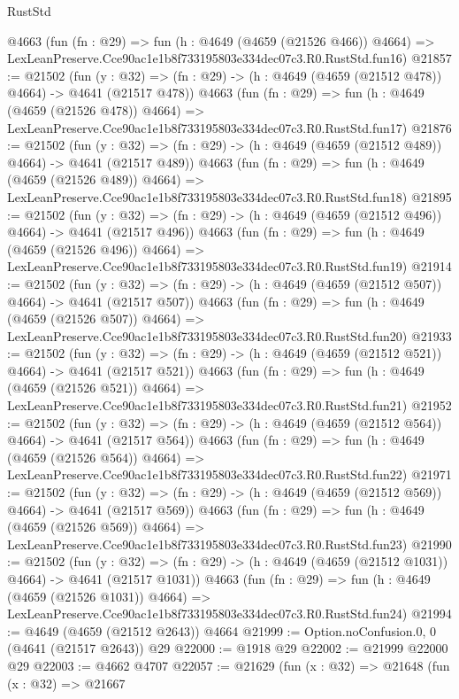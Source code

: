 \begin{lexlean}{RustStd}
\begin{coremodule}
    @4663
    (fun (fn : @29) =>
    fun (h : @4649 (@4659 (@21526 @466)) @4664) =>
    LexLeanPreserve.Cce90ac1e1b8f733195803e334dec07c3.R0.RustStd.fun16)
@21857 := @21502
    (fun (y : @32) => (fn : @29) -> (h : @4649 (@4659 (@21512 @478)) @4664) -> @4641 (@21517 @478))
    @4663
    (fun (fn : @29) =>
    fun (h : @4649 (@4659 (@21526 @478)) @4664) =>
    LexLeanPreserve.Cce90ac1e1b8f733195803e334dec07c3.R0.RustStd.fun17)
@21876 := @21502
    (fun (y : @32) => (fn : @29) -> (h : @4649 (@4659 (@21512 @489)) @4664) -> @4641 (@21517 @489))
    @4663
    (fun (fn : @29) =>
    fun (h : @4649 (@4659 (@21526 @489)) @4664) =>
    LexLeanPreserve.Cce90ac1e1b8f733195803e334dec07c3.R0.RustStd.fun18)
@21895 := @21502
    (fun (y : @32) => (fn : @29) -> (h : @4649 (@4659 (@21512 @496)) @4664) -> @4641 (@21517 @496))
    @4663
    (fun (fn : @29) =>
    fun (h : @4649 (@4659 (@21526 @496)) @4664) =>
    LexLeanPreserve.Cce90ac1e1b8f733195803e334dec07c3.R0.RustStd.fun19)
@21914 := @21502
    (fun (y : @32) => (fn : @29) -> (h : @4649 (@4659 (@21512 @507)) @4664) -> @4641 (@21517 @507))
    @4663
    (fun (fn : @29) =>
    fun (h : @4649 (@4659 (@21526 @507)) @4664) =>
    LexLeanPreserve.Cce90ac1e1b8f733195803e334dec07c3.R0.RustStd.fun20)
@21933 := @21502
    (fun (y : @32) => (fn : @29) -> (h : @4649 (@4659 (@21512 @521)) @4664) -> @4641 (@21517 @521))
    @4663
    (fun (fn : @29) =>
    fun (h : @4649 (@4659 (@21526 @521)) @4664) =>
    LexLeanPreserve.Cce90ac1e1b8f733195803e334dec07c3.R0.RustStd.fun21)
@21952 := @21502
    (fun (y : @32) => (fn : @29) -> (h : @4649 (@4659 (@21512 @564)) @4664) -> @4641 (@21517 @564))
    @4663
    (fun (fn : @29) =>
    fun (h : @4649 (@4659 (@21526 @564)) @4664) =>
    LexLeanPreserve.Cce90ac1e1b8f733195803e334dec07c3.R0.RustStd.fun22)
@21971 := @21502
    (fun (y : @32) => (fn : @29) -> (h : @4649 (@4659 (@21512 @569)) @4664) -> @4641 (@21517 @569))
    @4663
    (fun (fn : @29) =>
    fun (h : @4649 (@4659 (@21526 @569)) @4664) =>
    LexLeanPreserve.Cce90ac1e1b8f733195803e334dec07c3.R0.RustStd.fun23)
@21990 := @21502
    (fun (y : @32) =>
    (fn : @29) -> (h : @4649 (@4659 (@21512 @1031)) @4664) -> @4641 (@21517 @1031))
    @4663
    (fun (fn : @29) =>
    fun (h : @4649 (@4659 (@21526 @1031)) @4664) =>
    LexLeanPreserve.Cce90ac1e1b8f733195803e334dec07c3.R0.RustStd.fun24)
@21994 := @4649 (@4659 (@21512 @2643)) @4664
@21999 := Option.noConfusion.{0, 0} (@4641 (@21517 @2643)) @29
@22000 := @1918 @29
@22002 := @21999 @22000 @29
@22003 := @4662 @4707
@22057 := @21629
    (fun (x : @32) =>
    @21648
      (fun (x : @32) =>
      @21667

\end{coremodule}
\end{lexlean}
